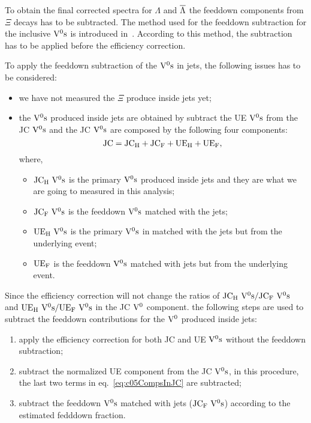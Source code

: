 To obtain the final corrected spectra for $\Lambda$ and $\overline{\Lambda}$ the feeddown
components from $\Xi$ decays has to be subtracted.
The method used for the  feeddown subtraction for the inclusive ${\rm V}^{0}{\rm s}$
is introduced in~\cite{Ali2012:ana501}.
According to this method, the subtraction has to be applied before the
efficiency correction.

To apply the feeddown subtraction of the ${\rm V}^{0}{\rm s}$ in jets,
the following issues has to be considered:
\begin{itemize}
\item we have not measured the $\Xi$ produce inside jets yet;
\item the ${\rm V}^{0}{\rm s}$ produced inside jets are obtained by subtract the
      UE ${\rm V}^{0}{\rm s}$ from the JC ${\rm V}^{0}{\rm s}$ and the JC ${\rm V}^{0}{\rm s}$ are composed
      by the following four components:
      \begin{equation}\label{eq:c05CompsInJC}
      {\rm JC}={\rm JC}_{\rm H}+
               {\rm JC}_{\rm F}+{\rm UE}_{\rm H}+{\rm UE}_{\rm F},
      \end{equation}
      where,
      \begin{itemize}
      \item ${\rm JC}_{\rm H}~{\rm V}^{0}{\rm s}$
            is the primary ${\rm V}^{0}{\rm s}$ produced inside jets and
            they are what we are going to measured in this analysis;
      \item ${\rm JC}_{\rm F}~{\rm V}^{0}{\rm s}$
            is the feeddown ${\rm V}^{0}{\rm s}$ matched with the jets;
      \item ${\rm UE}_{\rm H}~{\rm V}^{0}{\rm s}$
            is the primary ${\rm V}^{0}{\rm s}$ in matched with the jets but
            from the underlying event;
      \item ${\rm UE}_{\rm F}$ is the feeddown ${\rm V}^{0}{\rm s}$ matched with jets
            but from the underlying event.
      \end{itemize}
\end{itemize}

Since the efficiency correction will not change the ratios of
${\rm JC}_{\rm H}~{\rm V}^{0}{\rm s}/{\rm JC}_{\rm F}~{\rm V}^{0}{\rm s}$ and
${\rm UE}_{\rm H}~{\rm V}^{0}{\rm s}/{\rm UE}_{\rm F}~{\rm V}^{0}{\rm s}$
in the JC ${\rm V}^{0}$ component.
the following steps are used to subtract the feeddown contributions
for the ${\rm V}^{0}$ produced inside jets:
\begin{enumerate}
\item apply the efficiency correction for both JC and UE ${\rm V}^{0}{\rm s}$ without
      the feeddown subtraction;
\item subtract the normalized UE component from the JC ${\rm V}^{0}{\rm s}$,
      in this procedure,
      the last two terms in eq.~{\ref{eq:c05CompsInJC}} are subtracted;
\item subtract the feeddown ${\rm V}^{0}{\rm s}$ matched with
      jets (${\rm JC}_{\rm F}~{\rm V}^{0}{\rm s}$) according to the estimated
      fedddown fraction.
\end{enumerate}

